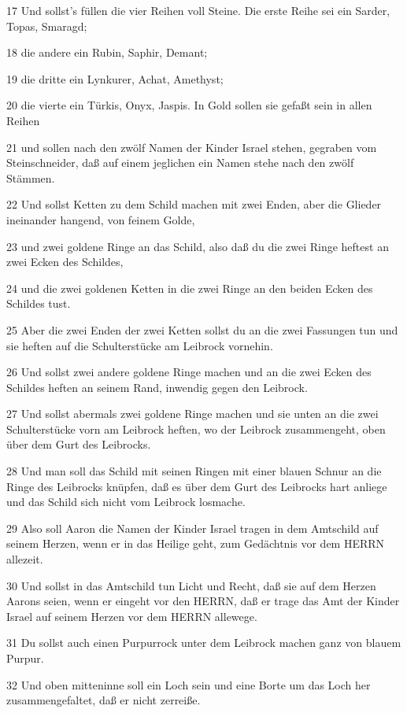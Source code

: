 \par 17 Und sollst's füllen die vier Reihen voll Steine. Die erste Reihe sei ein Sarder, Topas, Smaragd;
\par 18 die andere ein Rubin, Saphir, Demant;
\par 19 die dritte ein Lynkurer, Achat, Amethyst;
\par 20 die vierte ein Türkis, Onyx, Jaspis. In Gold sollen sie gefaßt sein in allen Reihen
\par 21 und sollen nach den zwölf Namen der Kinder Israel stehen, gegraben vom Steinschneider, daß auf einem jeglichen ein Namen stehe nach den zwölf Stämmen.
\par 22 Und sollst Ketten zu dem Schild machen mit zwei Enden, aber die Glieder ineinander hangend, von feinem Golde,
\par 23 und zwei goldene Ringe an das Schild, also daß du die zwei Ringe heftest an zwei Ecken des Schildes,
\par 24 und die zwei goldenen Ketten in die zwei Ringe an den beiden Ecken des Schildes tust.
\par 25 Aber die zwei Enden der zwei Ketten sollst du an die zwei Fassungen tun und sie heften auf die Schulterstücke am Leibrock vornehin.
\par 26 Und sollst zwei andere goldene Ringe machen und an die zwei Ecken des Schildes heften an seinem Rand, inwendig gegen den Leibrock.
\par 27 Und sollst abermals zwei goldene Ringe machen und sie unten an die zwei Schulterstücke vorn am Leibrock heften, wo der Leibrock zusammengeht, oben über dem Gurt des Leibrocks.
\par 28 Und man soll das Schild mit seinen Ringen mit einer blauen Schnur an die Ringe des Leibrocks knüpfen, daß es über dem Gurt des Leibrocks hart anliege und das Schild sich nicht vom Leibrock losmache.
\par 29 Also soll Aaron die Namen der Kinder Israel tragen in dem Amtschild auf seinem Herzen, wenn er in das Heilige geht, zum Gedächtnis vor dem HERRN allezeit.
\par 30 Und sollst in das Amtschild tun Licht und Recht, daß sie auf dem Herzen Aarons seien, wenn er eingeht vor den HERRN, daß er trage das Amt der Kinder Israel auf seinem Herzen vor dem HERRN allewege.
\par 31 Du sollst auch einen Purpurrock unter dem Leibrock machen ganz von blauem Purpur.
\par 32 Und oben mitteninne soll ein Loch sein und eine Borte um das Loch her zusammengefaltet, daß er nicht zerreiße.
